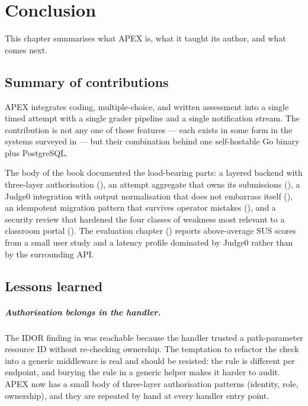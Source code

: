 \chapter{Conclusion}
\label{ch:conclusion}

This chapter summarises what APEX is, what it taught its author, and what comes next.

\section{Summary of contributions}

APEX integrates coding, multiple-choice, and written assessment into a single timed attempt with a single grader pipeline and a single notification stream. The contribution is not any one of those features --- each exists in some form in the systems surveyed in  --- but their combination behind one self-hostable Go binary plus PostgreSQL.

The body of the book documented the load-bearing parts: a layered backend with three-layer authorisation (), an attempt aggregate that owns its submissions (), a Judge0 integration with output normalisation that does not embarrass itself (), an idempotent migration pattern that survives operator mistakes (), and a security review that hardened the four classes of weakness most relevant to a classroom portal (). The evaluation chapter () reports above-average SUS scores from a small user study and a latency profile dominated by Judge0 rather than by the surrounding API.

\section{Lessons learned}

\paragraph{Authorisation belongs in the handler.} The IDOR finding in  was reachable because the handler trusted a path-parameter resource ID without re-checking ownership. The temptation to refactor the check into a generic middleware is real and should be resisted: the rule is different per endpoint, and burying the rule in a generic helper makes it harder to audit. APEX now has a small body of three-layer authorisation patterns (identity, role, ownership), and they are repeated by hand at every handler entry point.

